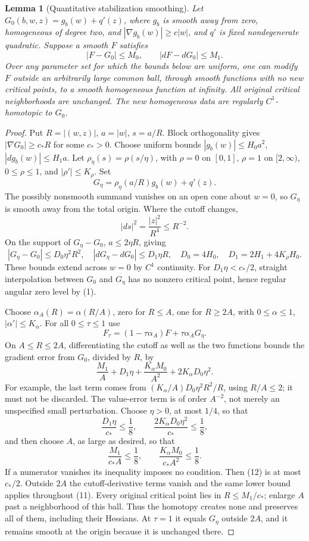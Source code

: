 \documentclass[11pt]{article}
\newtheorem{lemma}[theorem]{Lemma}
\begin{document}
\begin{lemma}[Quantitative stabilization smoothing]\label{lem:smoothing}
Let \(G_0(b,w,z)=g_b(w)+q'(z)\), where \(g_b\) is smooth away
from zero, homogeneous of degree two, and
\(|\nabla g_b(w)|\geq c|w|\), and \(q'\) is fixed nondegenerate
quadratic. Suppose a smooth \(F\) satisfies
\[
 |F-G_0|\leq M_0,\qquad |dF-dG_0|\leq M_1 .
 \]
Over any parameter set for which the bounds below are uniform,
one can modify \(F\) outside an arbitrarily large common ball,
through smooth functions with no new critical points, to a smooth
homogeneous function at infinity. All original critical
neighborhoods are unchanged. The new homogeneous data are
regularly \(C^1\)-homotopic to \(G_0\).
\end{lemma}
\begin{proof}
Put \(R=|(w,z)|\), \(a=|w|\), \(s=a/R\).
Block orthogonality gives
\(|\nabla G_0|\geq c_*R\) for some \(c_*>0\).
Choose uniform bounds
\(|g_b(w)|\leq H_0a^2\), \(|dg_b(w)|\leq H_1a\).
Let \(\rho_\eta(s)=\rho(s/\eta)\), with \(\rho=0\) on
\([0,1]\), \(\rho=1\) on \([2,\infty)\), \(0\leq\rho\leq1\),
and \(|\rho'|\leq K_\rho\). Set
\[
 G_\eta=\rho_\eta(a/R)g_b(w)+q'(z).
 \]
The possibly nonsmooth summand vanishes on an open cone about \(w=0\),
so \(G_\eta\) is smooth away from the total origin.
Where the cutoff changes,
\[
 |ds|^2=\frac{|z|^2}{R^4}\leq R^{-2}.
 \tag{9}
\]
On the support of \(G_\eta-G_0\), \(a\leq2\eta R\), giving
\[
 |G_\eta-G_0|\leq D_0\eta^2R^2,\quad
 |dG_\eta-dG_0|\leq D_1\eta R,\quad
 D_0=4H_0,\quad D_1=2H_1+4K_\rho H_0 .
 \tag{10}
\]
These bounds extend across \(w=0\) by \(C^1\) continuity.
For \(D_1\eta<c_*/2\), straight interpolation between \(G_0\)
and \(G_\eta\) has no nonzero critical point, hence regular angular
zero level by (1).

Choose \(\alpha_A(R)=\alpha(R/A)\), zero for \(R\leq A\), one
for \(R\geq2A\), with \(0\leq\alpha\leq1\),
\(|\alpha'|\leq K_\alpha\). For all \(0\leq\tau\leq1\) use
\[
 F_\tau=(1-\tau\alpha_A)F+\tau\alpha_AG_\eta .
 \tag{11}
\]
On \(A\leq R\leq2A\), differentiating the cutoff as well as the
two functions bounds the gradient error from \(G_0\), divided by \(R\),
by
\[
 \frac{M_1}{A}+D_1\eta+
 \frac{K_\alpha M_0}{A^2}+2K_\alpha D_0\eta^2 .
 \tag{12}
\]
For example, the last term comes from
\((K_\alpha/A)D_0\eta^2R^2/R\), using \(R/A\leq2\);
it must not be discarded. The value-error term is of order \(A^{-2}\),
not merely an unspecified small perturbation.
Choose \(\eta>0\), at most \(1/4\), so that
\[
 \frac{D_1\eta}{c_*}\leq\frac18,\qquad
 \frac{2K_\alpha D_0\eta^2}{c_*}\leq\frac18,
 \]
and then choose \(A\), as large as desired, so that
\[
 \frac{M_1}{c_*A}\leq\frac18,\qquad
 \frac{K_\alpha M_0}{c_*A^2}\leq\frac18 .
 \tag{13}
\]
If a numerator vanishes its inequality imposes no condition.
Then (12) is at most \(c_*/2\).
Outside \(2A\) the cutoff-derivative terms vanish and the same
lower bound applies throughout (11). Every original critical point
lies in \(R\leq M_1/c_*\); enlarge \(A\) past a neighborhood of this
ball. Thus the homotopy creates none and preserves all of them,
including their Hessians. At \(\tau=1\) it equals \(G_\eta\)
outside \(2A\), and it remains smooth at the origin because it is
unchanged there.


\end{proof}
\end{document}
